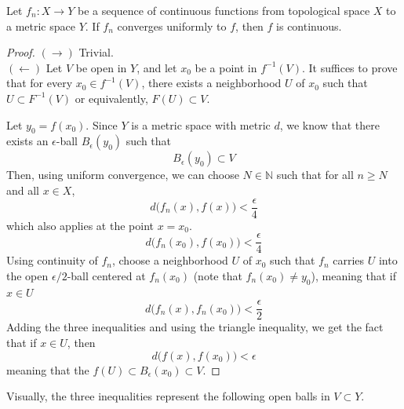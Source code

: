 \documentclass{article}
\begin{document}
    \begin{theorem}
    Let $f_n: X \longrightarrow Y$ be a sequence of continuous functions from topological space $X$ to a metric space $Y$. If $f_n$ converges uniformly to $f$, then $f$ is continuous. 
    \end{theorem}
    \begin{proof}
    $(\rightarrow)$ Trivial. \\
    $(\leftarrow)$ Let $V$ be open in $Y$, and let $x_0$ be a point in $f^{-1} (V)$. It suffices to prove that for every $x_0 \in f^{-1} (V)$, there exists a neighborhood $U$ of $x_0$ such that $U \subset F^{-1} (V)$ or equivalently, $F(U) \subset V$. 

    Let $y_0 = f(x_0)$. Since $Y$ is a metric space with metric $d$, we know that there exists an $\epsilon$-ball $B_\epsilon (y_0)$ such that
    \[B_\epsilon (y_0) \subset V\]
    Then, using uniform convergence, we can choose $N \in \mathbb{N}$ such that for all $n \geq N$ and all $x \in X$, 
    \[d \big( f_n (x), f(x) \big) < \frac{\epsilon}{4}\]
    which also applies at the point $x = x_0$. 
    \[d \big( f_n (x_0), f(x_0) \big) < \frac{\epsilon}{4}\]
    Using continuity of $f_n$, choose a neighborhood $U$ of $x_0$ such that $f_n$ carries $U$ into the open $\epsilon/2$-ball centered at $f_n (x_0)$ (note that $f_n (x_0) \neq y_0$), meaning that if $x \in U$
    \[d \big( f_n (x), f_n (x_0) \big) < \frac{\epsilon}{2}\]
    Adding the three inequalities and using the triangle inequality, we get the fact that if $x \in U$, then 
    \[d \big( f(x), f(x_0) \big) < \epsilon\]
    meaning that the $f(U) \subset B_\epsilon (x_0) \subset V$. 
    \end{proof}

    Visually, the three inequalities represent the following open balls in $V \subset Y$.
    \begin{center}
    \end{center}
\end{document}
